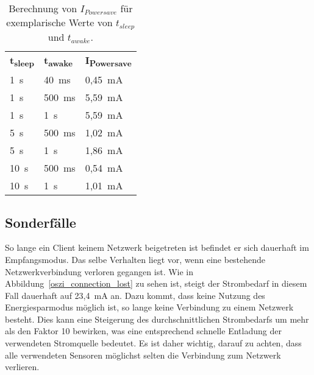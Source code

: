 \begin{table}
    \begin{center}
        \begin{tabular}{lll}
            \textbf{t\textsubscript{sleep}} & \textbf{t\textsubscript{awake}} & \textbf{I\textsubscript{Powersave}} \\
            1~s  & 40~ms  & 0,45~mA \\
            1~s  & 500~ms & 5,59~mA \\
            1~s  & 1~s    & 5,59~mA \\
            5~s  & 500~ms & 1,02~mA \\
            5~s  & 1~s    & 1,86~mA \\
            10~s & 500~ms & 0,54~mA \\
            10~s & 1~s    & 1,01~mA 
        \end{tabular}
    \end{center}
    \caption{Berechnung von $I_{Powersave}$ für exemplarische Werte von $t_{sleep}$ und $t_{awake}$.}
    \label{werte_Ipowersave}
\end{table}

\subsection{Sonderfälle}\label{leistungsaufnahme_sonderfaelle}
\Abbildungps{!htb}{0.75}{oszi/not_joined.jpg}{oszi_not_joined}{Client mit deaktiviertem Empfangsmodus.
    }
\Abbildungps{!htb}{0.75}{oszi/joined.jpg}{oszi_joined}{Beitrittsvorgang eines Clients in ein Netzwerk.
    }

So lange ein Client keinem Netzwerk beigetreten ist befindet er sich dauerhaft im Empfangsmodus. Das selbe Verhalten liegt
vor, wenn eine bestehende Netzwerkverbindung verloren gegangen ist. Wie in Abbildung~\ref{oszi_connection_lost} zu sehen
ist, steigt der Strombedarf in diesem Fall dauerhaft auf 23,4~mA an. Dazu kommt, dass keine Nutzung des Energiesparmodus
möglich ist, so lange keine Verbindung zu einem Netzwerk besteht. Dies kann eine Steigerung des durchschnittlichen
Strombedarfs um mehr als den Faktor 10 bewirken, was eine entsprechend schnelle Entladung der verwendeten Stromquelle bedeutet.
Es ist daher wichtig, darauf zu achten, dass alle verwendeten Sensoren möglichst selten die Verbindung zum 
Netzwerk verlieren.

